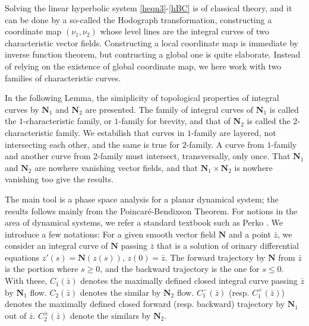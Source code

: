 \documentclass[11pt]{amsart}
\theoremstyle{plain}
\theoremstyle{remark}
\numberwithin{equation}{section}
\numberwithin{Thm}{section}
\def\N{{\mathbf N}}
\begin{document}
Solving the linear hyperbolic system \eqref{heqn3}-\eqref{hBC} is of classical theory, and it can be done by a so-called the Hodograph transformation, constructing a coordinate map $(\nu_1,\nu_2)$ whose level lines are the integral curves of two characteristic vector fields. Constructing a local coordinate map is immediate by inverse function theorem, but contructing a global one is quite elaborate. Instead of relying on the existence of global coordinate map, we here work with two families of characteristic curves. 

In the following Lemma, the simiplicity of topological properties of integral curves by $\N_1$ and $\N_2$ are presented. The family of integral curves of $\N_1$ is called the $1$-characteristic family, or $1$-family for brevity, and that of $\N_2$ is called the $2$-characteristic family. We estabilish that curves in $1$-family are layered, not intersecting each other, and the same is true for $2$-family. A curve from $1$-family and another curve from $2$-family must intersect, transversally, only once. That $\N_1$ and $\N_2$ are nowhere vanishing vector fields, and that $\N_1\times \N_2$ is nowhere vanishing too give the results.

The main tool is a phase space analysis for a planar dynamical system; the results follows mainly from the Poincar\'e-Bendixson Theorem. For notions in the area of dynamical systems, we refer a standard textbook such as Perko \cite{perko_differential_2001}.  We introduce a few notations: For a given smooth vector field $\N$ and a point $\bar z$, we consider an integral curve of $\N$ passing $\bar z$ that is a solution of orinary differential equations $z'(s) = \N(z(s))$, $z(0)=\bar z$. The forward trajectory by $\N$ from $\bar{z}$ is the portion where $s\ge0$, and the backward trajectory is the one for $s\le0$. With these, $C_1(\bar z)$ denotes the maximally defined closed integral curve passing $\bar z$ by $\N_1$ flow. $C_2(\bar z)$ denotes the similar by $\N_2$ flow. $C^-_1(\bar z)$ (resp. $C^+_1(\bar z)$) denotes the maximally defined closed forward (resp. backward) trajectory by $\N_1$ out of $\bar z$. $C^\pm_2(\bar z)$ denote the similars by $\N_2$. 
\end{document}
